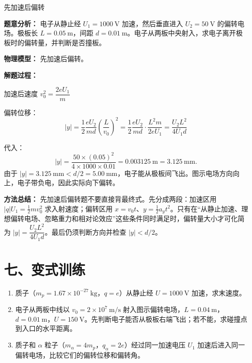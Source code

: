 \begin{examplebox}{先加速后偏转}

\textbf{题意分析：} 电子从静止经 $U_1 = 1000\ \mathrm{V}$ 加速，然后垂直进入 $U_2 = 50\ \mathrm{V}$ 的偏转电场。极板长 $L = 0.05\ \mathrm{m}$，间距 $d = 0.01\ \mathrm{m}$。电子从两板中央射入，求电子离开极板时的偏转量，并判断是否撞板。

\textbf{物理模型：} 先加速后偏转。

\begin{center}


\label{fig:accelerate-deflect-example}
\end{center}

\textbf{解题过程：}

加速后速度 $v_0^2 = \dfrac{2eU_1}{m}$

偏转位移：
\[
|y| = \frac12 \frac{eU_2}{md} \left(\frac{L}{v_0}\right)^2
= \frac12 \frac{eU_2}{md} \cdot \frac{L^2 m}{2eU_1}
= \frac{U_2 L^2}{4U_1 d}
\]

代入：
\[
|y| = \frac{50 \times (0.05)^2}{4 \times 1000 \times 0.01}
=0.003125\ \mathrm{m}=3.125\ \mathrm{mm}.
\]
由于 $|y|=3.125\ \mathrm{mm}<d/2=5.00\ \mathrm{mm}$，电子能从极板间飞出。图示电场方向向上，电子带负电，因此实际向下偏转。

\textbf{方法总结：} 先加速后偏转题不要直接背最终式。先分成两段：加速区用 $\lvert q\rvert U_1=\frac12mv_0^2$ 求入射速度；偏转区用 $x=v_0t$、$y=\frac12a_yt^2$。只有在“从静止加速、理想偏转电场、忽略重力和相对论效应”这些条件同时满足时，偏转量大小才可化简为 $|y| = \dfrac{U_2 L^2}{4U_1 d}$。最后仍须判断方向并检查 $|y|<d/2$。

\end{examplebox}

\section*{七、变式训练}

\begin{enumerate}
  \item 质子（$m_p = 1.67 \times 10^{-27}\ \mathrm{kg}$，$q = e$）从静止经 $U = 1000\ \mathrm{V}$ 加速，求末速度。

  \item 电子从两板中线以 $v_0 = 2 \times 10^7\ \mathrm{m/s}$ 射入图示偏转电场，$L = 0.04\ \mathrm{m}$，$d = 0.01\ \mathrm{m}$，$U = 150\ \mathrm{V}$。先判断电子能否从极板右端飞出；若不能，求碰撞点到入口的水平距离。
  \begin{center}
  
  \end{center}

  \item 质子和 $\alpha$ 粒子（$m_\alpha = 4m_p$，$q_\alpha = 2e$）经过同一加速电压 $U_1$ 加速后进入同一偏转电场，比较它们的偏转位移和偏转角。
  \begin{center}
  
\end{center}
\end{enumerate}

